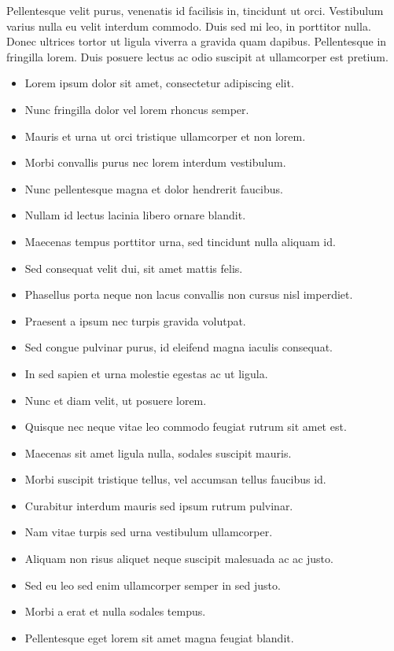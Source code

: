 \documentclass[12pt,a4paper]{report}
\begin{document}
Pellentesque velit purus, venenatis id facilisis in, tincidunt ut orci. Vestibulum varius nulla eu velit interdum commodo. Duis sed mi leo, in porttitor nulla. Donec ultrices tortor ut ligula viverra a gravida quam dapibus. Pellentesque in fringilla lorem. Duis posuere lectus ac odio suscipit at ullamcorper est pretium.



\begin{itemize}
\renewcommand{\labelitemi}{$\triangleright$}
%
\item
Lorem ipsum dolor sit amet, consectetur adipiscing elit.
\item
Nunc fringilla dolor vel lorem rhoncus semper.
\item
Mauris et urna ut orci tristique ullamcorper et non lorem.
\item
Morbi convallis purus nec lorem interdum vestibulum.
\item
Nunc pellentesque magna et dolor hendrerit faucibus.
\item
Nullam id lectus lacinia libero ornare blandit.
\item
Maecenas tempus porttitor urna, sed tincidunt nulla aliquam id.
\item
Sed consequat velit dui, sit amet mattis felis.
\item
Phasellus porta neque non lacus convallis non cursus nisl imperdiet.
\item
Praesent a ipsum nec turpis gravida volutpat.
\item
Sed congue pulvinar purus, id eleifend magna iaculis consequat.
\item
In sed sapien et urna molestie egestas ac ut ligula.
\item
Nunc et diam velit, ut posuere lorem.
\item
Quisque nec neque vitae leo commodo feugiat rutrum sit amet est.
\item
Maecenas sit amet ligula nulla, sodales suscipit mauris.
\item
Morbi suscipit tristique tellus, vel accumsan tellus faucibus id.
\item
Curabitur interdum mauris sed ipsum rutrum pulvinar.
\item
Nam vitae turpis sed urna vestibulum ullamcorper.
\item
Aliquam non risus aliquet neque suscipit malesuada ac ac justo.
\item
Sed eu leo sed enim ullamcorper semper in sed justo.
\item
Morbi a erat et nulla sodales tempus.
\item
Pellentesque eget lorem sit amet magna feugiat blandit.
%
\end{itemize}
\end{document}
